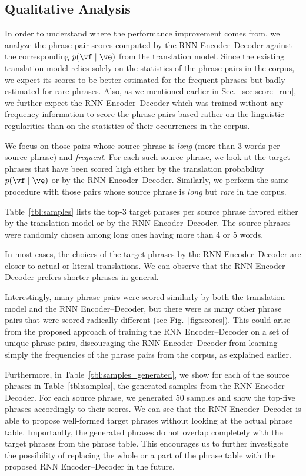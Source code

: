 \subsection{Qualitative Analysis}

In order to understand where the performance improvement comes from, we analyze
the phrase pair scores computed by the RNN Encoder--Decoder against the
corresponding
$p(\vf \mid \ve)$ from the translation model.  Since the existing translation model
relies solely on the statistics of the phrase pairs in the corpus, we expect
its scores to be better estimated for the frequent phrases but badly estimated
for rare phrases.  Also, as we mentioned earlier in
Sec.~\mbox{\ref{sec:score_rnn}}, we further expect the RNN Encoder--Decoder
which was trained without any frequency information to score the phrase pairs
based rather on the linguistic regularities than on the statistics of their
occurrences in the corpus.

We focus on those pairs whose source phrase is \textit{long} (more than 3 words
per source phrase) and \textit{frequent}. For each such source phrase, we look
at the target phrases that have been scored high either by the translation
probability $p(\vf \mid \ve)$ or by the RNN Encoder--Decoder.  Similarly, we
perform the same procedure with those pairs whose source phrase is \textit{long}
but \textit{rare} in the corpus.

Table~\mbox{\ref{tbl:samples}} lists the top-$3$ target phrases per source
phrase favored either by the translation model or by the RNN Encoder--Decoder.
The source phrases were randomly chosen among long ones having more than 4 or 5
words.

In most cases, the choices of the target phrases by the RNN Encoder--Decoder
are closer to actual or literal translations. We can observe that the RNN
Encoder--Decoder prefers shorter phrases in general. 

Interestingly, many phrase pairs were scored similarly by both the translation
model and the RNN Encoder--Decoder, but there were as many other phrase pairs
that were scored radically different (see Fig.~\mbox{\ref{fig:scores}}). This could 
arise from the proposed approach of training the RNN Encoder--Decoder on a
set of unique phrase pairs, discouraging the RNN Encoder--Decoder from learning
simply the frequencies of the phrase pairs from the corpus, as 
explained earlier.

Furthermore, in Table~\mbox{\ref{tbl:samples_generated}}, we show for each of
the source phrases in Table~\mbox{\ref{tbl:samples}}, the generated samples
from the RNN Encoder--Decoder. For each source phrase, we generated 50 samples
and show the top-five phrases accordingly to their scores. We can see that the
RNN Encoder--Decoder is able to propose well-formed target phrases without
looking at the actual phrase table. Importantly, the generated phrases do not
overlap completely with the target phrases from the phrase table.  This
encourages us to further investigate the possibility of replacing the whole or
a part of the phrase table with the proposed RNN Encoder--Decoder in the
future.

